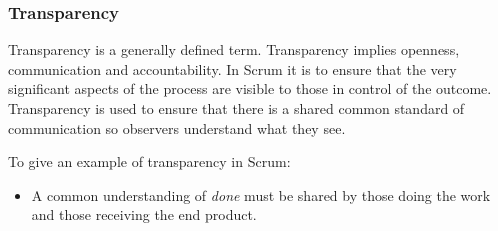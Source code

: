 \subsubsection{Transparency}


Transparency is a generally defined term. Transparency implies openness, communication and
accountability. In Scrum it is to ensure that the very significant aspects of the process 
are visible to those in control of the outcome\cite{scrumguide11}. Transparency is used 
to ensure that there is a shared common standard of communication so observers understand 
what they see\cite{scrumguide11}.

To give an example of transparency in Scrum:


\begin{itemize}
	\item A common understanding of \textit{done} must be shared by those doing the work and 
those receiving the end product\cite{scrumguide11}.
\end{itemize}